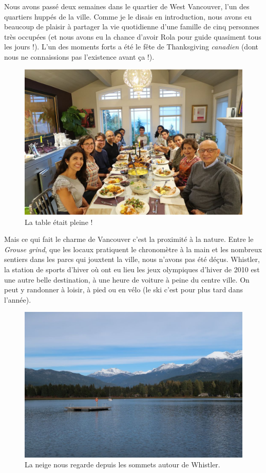 Nous avons passé deux semaines dans le quartier de West Vancouver, l'un
des quartiers huppés de la ville. Comme je le disais en introduction,
nous avons eu beaucoup de plaisir à partager la vie quotidienne d'une
famille de cinq personnes très occupées (et nous avons eu la chance
d'avoir Rola pour guide quasiment tous les jours !). L'un des moments
forts a été le fête de Thanksgiving \emph{canadien} (dont nous ne
connaissions pas l'existence avant ça !).

\begin{figure}
\centering
\includegraphics{images/20181016_thanksgiving.JPG}
\caption{La table était pleine !}
\end{figure}

Mais ce qui fait le charme de Vancouver c'est la proximité à la nature.
Entre le \emph{Grouse grind}, que les locaux pratiquent le chronomètre à
la main et les nombreux sentiers dans les parcs qui jouxtent la ville,
nous n'avons pas été déçus. Whistler, la station de sports d'hiver où
ont eu lieu les jeux olympiques d'hiver de 2010 est une autre belle
destination, à une heure de voiture à peine du centre ville. On peut y
randonner à loisir, à pied ou en vélo (le ski c'est pour plus tard dans
l'année).

\begin{figure}
\centering
\includegraphics{images/20181016_whistler.JPG}
\caption{La neige nous regarde depuis les sommets autour de Whistler.}
\end{figure}

